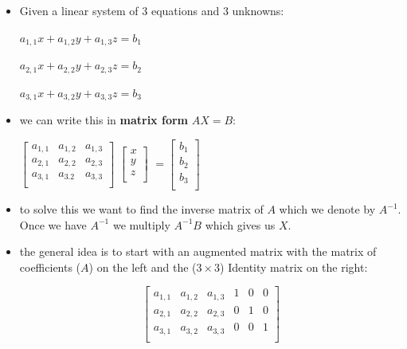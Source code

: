 \documentclass[12pt]{article}
\begin{document}
\begin{itemize}
\item Given a linear system of $3$ equations and $3$ unknowns:
\newline

\centerline{$a_{1,1}x + a_{1,2}y + a_{1,3}z  = b_{1}$}

\vspace{.3cm}

\centerline{$a_{2,1}x + a_{2,2}y + a_{2,3}z  = b_{2}$}

\vspace{.3cm}

\centerline{$a_{3,1}x + a_{3,2}y + a_{3,3}z = b_{3}$}

\item we can write this in \textbf{matrix form} $AX = B$:
\newline

\centerline{
$\begin{bmatrix}                                        
       a_{1,1} & a_{1,2}& a_{1,3}           \\[1em]			
       a_{2,1}& a_{2,2} & a_{2,3} \\[1em]       		
       a_{3,1} & a_{3.2} & a_{3,3}   \\		
     \end{bmatrix}$
$\begin{bmatrix}                                        
       x           \\[1em]			
       y  \\[1em]       		
       z \\		
     \end{bmatrix}$
$= \begin{bmatrix}                                        
       b_{1}           \\[1em]			
       b_{2}  \\[1em]       		
       b_{3} \\		
     \end{bmatrix}$}

\item to solve this we want to find the inverse matrix of $A$ which we denote by $A^{-1}$. Once we have $A^{-1}$ we multiply $A^{-1}B$ which gives us $X$. 

\item the general idea is to start with an augmented matrix with the matrix of coefficients ($A$) on the left and the ($3 \times 3$) Identity matrix on the right:

\[
\left[
\begin{array}{ccc|ccc}
a_{1,1} & a_{1,2} & a_{1,3} & 1 & 0 & 0 \\
a_{2,1} & a_{2,2} & a_{2,3} & 0 & 1 & 0 \\
a_{3,1} & a_{3,2} & a_{3,3} & 0 & 0 & 1 \\
\end{array}
\right]
\]


\end{itemize}
\end{document}
